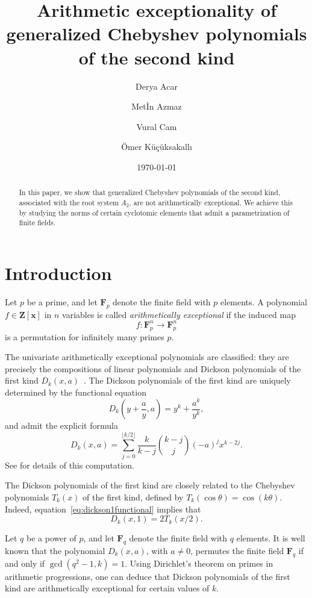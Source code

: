 \documentclass{amsart}
\title[Generalized Chebyshev polynomials of the second kind]{Arithmetic exceptionality of generalized Chebyshev polynomials of the second kind}
\author{Derya Acar}
\author{Met\.{I}n Azmaz}
\author{Vural Cam}
\author{Ömer Küçüksakallı}
\date{\today}
\newcommand{\F}{\mathbf F}
\numberwithin{equation}{section}
\theoremstyle{plain}
\theoremstyle{definition}
\begin{document}
\begin{abstract}
In this paper, we show that generalized Chebyshev polynomials of the second kind, associated with the root system  $A_2$, are not arithmetically exceptional. We achieve this by studying the norms of certain cyclotomic elements that admit a parametrization of finite fields.
\end{abstract}




\maketitle	

\section{Introduction}
Let $p$ be a prime, and let $\F_p$ denote the finite field with $p$ elements. A polynomial
$f\in \mathbf{Z}[\mathbf{x}]$ in $n$ variables is called \emph{arithmetically exceptional} if the induced map
\[f:\F_p^n\to \F_p^n\]
is a permutation for infinitely many primes $p$.

The univariate arithmetically exceptional polynomials are classified: they are precisely the compositions of linear polynomials and Dickson polynomials of the first kind $D_k(x,a)$~\cite{fried1970}. The Dickson polynomials of the first kind are uniquely determined by the functional equation
\begin{equation}\label{eq:dickson1functional}
	D_k\left(y+\frac{a}{y},a\right)=y^k+\frac{a^k}{y^k},
\end{equation}
and admit the explicit formula
\begin{equation}\label{eq:dickson1formula}
	D_k(x,a)
	=
	\sum_{j=0}^{\lfloor k/2\rfloor}
	\frac{k}{k-j}\binom{k-j}{j}
	(-a)^j x^{k-2j}.
\end{equation}
See \cite[(7.5)]{finitefieldsLidl1997} for details of this computation.

The Dickson polynomials of the first kind are closely related to the Chebyshev polynomials $T_k(x)$ of the first kind, defined by $T_k(\cos\theta)=\cos(k\theta)$. Indeed, equation~\eqref{eq:dickson1functional} implies that
\[
D_k(x,1)=2T_k(x/2).
\]

Let $q$ be a power of $p$, and let $\F_q$ denote the finite field with $q$ elements. It is well known that the polynomial $D_k(x,a)$, with $a\neq 0$, permutes the finite field $\F_q$ if and only if $\gcd(q^2-1,k)=1$. Using Dirichlet's theorem on primes in arithmetic progressions, one can deduce that Dickson polynomials of the first kind are arithmetically exceptional for certain values of $k$.
\end{document}

